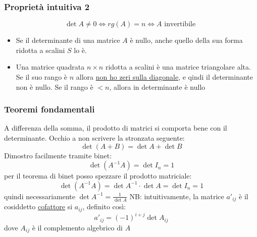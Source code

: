 \documentclass[12pt,a4paper,oneside]{article}
\begin{document}
\subsubsection*{Proprietà intuitiva 2}
\[
	\det A \neq 0 \Leftrightarrow rg\left( A \right)  = n \Leftrightarrow A \text{ invertibile }
\]
\begin{itemize}
	\item Se il determinante di una matrice $ A $ è nullo,  anche quello della sua forma ridotta a scalini $ S $ lo è.
	\item Una matrice quadrata $ n\times n $ ridotta a scalini è una matrice triangolare alta. Se il suo rango è $ n $ allora \underline{non ho zeri sulla diagonale}, e qindi il determinante non è nullo. Se il rango è $ < n $, allora in determinante è nullo
\end{itemize}
\subsubsection*{Teoremi fondamentali}
A differenza della somma, il prodotto di matrici si comporta bene con il determinante. Occhio a non scrivere la stronzata seguente:
\[
	\det \left( A+B \right) = \det A + \det B
\]
\label{corollariobinet}
Dimostro facilmente tramite binet:
\[
	\det \left( A^{-1}A \right) = \det I_n = 1
\]
per il teorema di binet posso spezzare il prodotto matriciale:
\[
	\det \left( A^{-1}A \right)  = \det A^{-1} \cdot \det A = \det I_n = 1
\]
quindi necessariamente $ \det A^{-1} = \frac{1}{ \det A} $
NB: intuitivamente, la matrice $ a'_{ij} $ è il cosiddetto \underline{cofattore} si $ a_{ij} $, definito così:
\[
	a'_{ij}= \left( -1 \right) ^{i+j} \det A_{ij}
\]
dove $ A_{ij} $ è il complemento algebrico di $ A $
\end{document}
